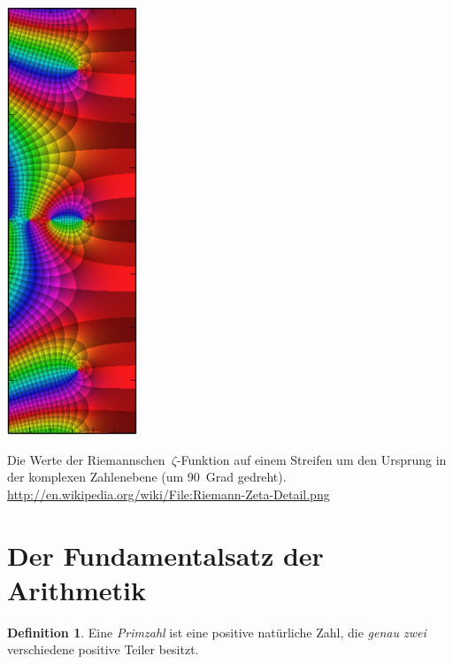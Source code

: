 \documentclass[twoside]{../zirkelblatt1415}
\theoremstyle{definition}
\newtheorem{defn}{Definition}[section]
\theoremstyle{plain}
\theoremstyle{remark}
\begin{document}

\begin{center}
\includegraphics[angle=90]{zeta-function-complex}

\vspace{0.4cm}
\begin{minipage}{0.9\textwidth}
\scriptsize Die Werte der Riemannschen~$\zeta$-Funktion auf einem Streifen um den
Ursprung in der komplexen Zahlen\-ebene (um 90~Grad gedreht).
\url{http://en.wikipedia.org/wiki/File:Riemann-Zeta-Detail.png}\par
\end{minipage}
\end{center}

\vspace{1em}
{\renewcommand{\addvspace}[1]{\vskip0.6em}
\tableofcontents%
}

\newpage

\section{Der Fundamentalsatz der Arithmetik}

\begin{defn}Eine \emph{Primzahl} ist eine positive natürliche Zahl, die
\emph{genau zwei} verschiedene positive Teiler besitzt.\end{defn}
\end{document}
